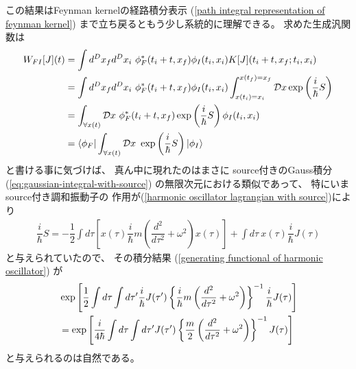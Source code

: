 この結果はFeynman kernelの経路積分表示
(\ref{path integral representation of feynman kernel})
まで立ち戻るともう少し系統的に理解できる。
求めた生成汎関数は
\begin{align}
    W_{FI}[J](t)
&=
    \int d^D x_f d^D x_i\ 
        \phi_F^*( t_i + t, \bm{x}_f)
        \phi_I  ( t_i    , \bm{x}_i)
        K[J](t_i + t, \bm{x}_f; t_i, \bm{x}_i)
\notag\\&
=
    \int d^D x_f d^D x_i\ 
        \phi_F^*( t_i + t, \bm{x}_f)
        \phi_I  ( t_i    , \bm{x}_i)
    \int_{x(t_i) = x_i}^{x(t_f) = x_f}
    \mathcal{D} x
    \exp\left(\dfrac{i}{\hbar}S \right)
\notag\\&
=
    \int_{\forall \bm{x}(t)}
    \mathcal{D} x\ 
        \phi_F^*( t_i + t, \bm{x}_f)
    \exp\left(\dfrac{i}{\hbar}S \right)
        \phi_I  ( t_i    , \bm{x}_i)
\notag\\&
=
        \bra{ \phi_F }
    \int_{\forall \bm{x}(t)}
    \mathcal{D} x\ 
    \exp\left(\dfrac{i}{\hbar}S \right)
        \ket{ \phi_I }
\end{align}
と書ける事に気づけば、
真ん中に現れたのはまさに
source付きのGauss積分
(\ref{eq:gaussian-integral-with-source})
の無限次元における類似であって、
特にいまsource付き調和振動子の
作用が(\ref{harmonic oscillator lagrangian with source})により
\begin{align}
        \dfrac{i}{\hbar} S
=
    -
    \dfrac{1}{2}
    \int d \tau
\left[
        x(\tau)
        \dfrac{i}{\hbar}
        m
    \left(
        \dfrac{d^2}{d\tau^2}
        +
        \omega^2
    \right)
    x(\tau)
\right]
    +
    \int d \tau\ 
    x(\tau)
    \dfrac{i}{\hbar}
    J(\tau)
\end{align}
と与えられていたので、
その積分結果
(\ref{generating functional of harmonic oscillator})
が
\begin{align}
    &
    \exp \left[
        \dfrac{1}{2}
        \int d \tau
        \int d \tau'
        \dfrac{i}{\hbar}
        J(\tau')
    \left\{
        \dfrac{i}{\hbar}
        m
        \left(
            \dfrac{d^2}{d\tau^2}
        +
            \omega^2
        \right)
    \right\}^{-1}
        \dfrac{i}{\hbar}
        J(\tau)
    \right]
\notag\\&
=
    \exp \left[
        \dfrac{i}{4 \hbar}
        \int d \tau
        \int d \tau'
        J(\tau')
    \left\{
        \dfrac{m}{2}
        \left(
            \dfrac{d^2}{d\tau^2}
        +
            \omega^2
        \right)
    \right\}^{-1}
        J(\tau)
    \right]
\end{align}
と与えられるのは自然である。


